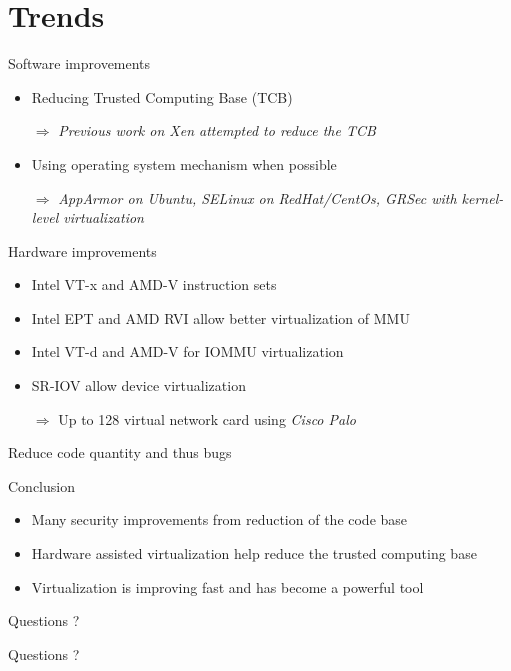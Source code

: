 \documentclass{beamer}
\begin{document}
\section{Trends}
\begin{frame}{Software improvements}
	\begin{itemize}
	\item Reducing Trusted Computing Base (TCB)
	\item[$\Rightarrow$] \emph{Previous work on Xen attempted to reduce the TCB}\\
	\item Using operating system mechanism when possible
	\item[$\Rightarrow$]\emph{AppArmor on Ubuntu, SELinux on RedHat/CentOs, GRSec with kernel-level virtualization}\\
	\end{itemize}
\end{frame}

\begin{frame}{Hardware improvements}
	\begin{itemize}
	\item Intel VT-x and AMD-V instruction sets
	\item Intel EPT and AMD RVI allow better virtualization of MMU
	\item Intel VT-d and AMD-V for IOMMU virtualization
	\item SR-IOV allow device virtualization
	\item[$\Rightarrow$] Up to 128 virtual network card using \emph{Cisco Palo}
	\end{itemize}
	\alert{Reduce code quantity and thus bugs}
\end{frame}

\begin{frame}{Conclusion}
	\begin{itemize}
	\item Many security improvements from reduction of the code base
	\item Hardware assisted virtualization help reduce the trusted computing base
	\item Virtualization is improving fast and has become a powerful tool
	\end{itemize}
\end{frame}

\begin{frame}{Questions ?}
		\begin{center}
		Questions ?
		\end{center}
\end{frame}
\end{document}

